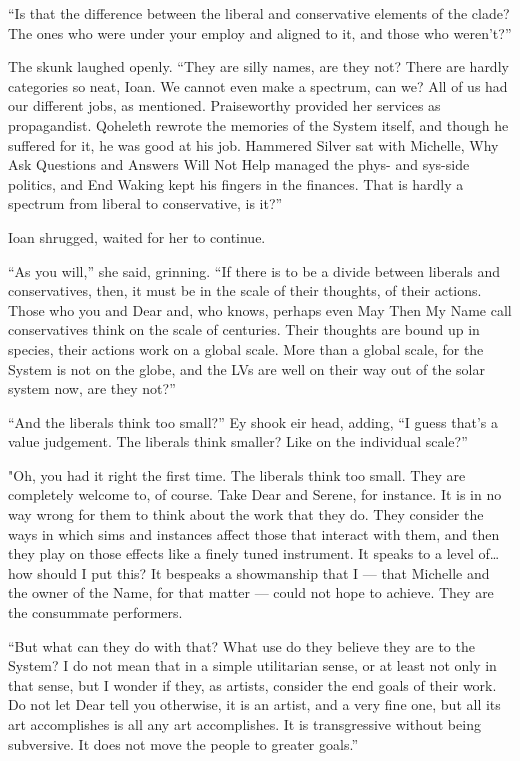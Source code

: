 ``Is that the difference between the liberal and conservative elements of the clade? The ones who were under your employ and aligned to it, and those who weren't?''

The skunk laughed openly. ``They are silly names, are they not? There are hardly categories so neat, Ioan. We cannot even make a spectrum, can we? All of us had our different jobs, as mentioned. Praiseworthy provided her services as propagandist. Qoheleth rewrote the memories of the System itself, and though he suffered for it, he was good at his job. Hammered Silver sat with Michelle, Why Ask Questions and Answers Will Not Help managed the phys- and sys-side politics, and End Waking kept his fingers in the finances. That is hardly a spectrum from liberal to conservative, is it?''

Ioan shrugged, waited for her to continue.

``As you will,'' she said, grinning. ``If there is to be a divide between liberals and conservatives, then, it must be in the scale of their thoughts, of their actions. Those who you and Dear and, who knows, perhaps even May Then My Name call conservatives think on the scale of centuries. Their thoughts are bound up in species, their actions work on a global scale. More than a global scale, for the System is not on the globe, and the LVs are well on their way out of the solar system now, are they not?''

``And the liberals think too small?'' Ey shook eir head, adding, ``I guess that's a value judgement. The liberals think smaller? Like on the individual scale?''

"Oh, you had it right the first time. The liberals think too small. They are completely welcome to, of course. Take Dear and Serene, for instance. It is in no way wrong for them to think about the work that they do. They consider the ways in which sims and instances affect those that interact with them, and then they play on those effects like a finely tuned instrument. It speaks to a level of\ldots how should I put this? It bespeaks a showmanship that I — that Michelle and the owner of the Name, for that matter — could not hope to achieve. They are the consummate performers.

``But what can they do with that? What use do they believe they are to the System? I do not mean that in a simple utilitarian sense, or at least not only in that sense, but I wonder if they, as artists, consider the end goals of their work. Do not let Dear tell you otherwise, it is an artist, and a very fine one, but all its art accomplishes is all any art accomplishes. It is transgressive without being subversive. It does not move the people to greater goals.''

